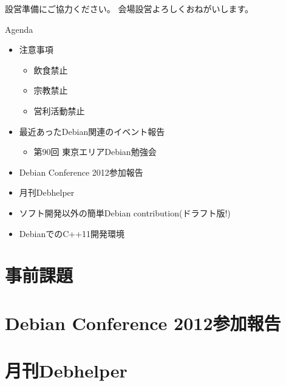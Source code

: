 \frame{\titlepage{}}

\begin{frame}{設営準備にご協力ください。}
会場設営よろしくおねがいします。
\end{frame}

\begin{frame}{Agenda}
\begin{minipage}[t]{0.45\hsize}
  \begin{itemize}
  \item 注意事項
	\begin{itemize}
	 \item 飲食禁止
	 \item 宗教禁止
	 \item 営利活動禁止
	\end{itemize}
   \item 最近あったDebian関連のイベント報告
	\begin{itemize}
        \item 第90回 東京エリアDebian勉強会
	\end{itemize}
 \end{itemize}
\end{minipage} 
\begin{minipage}[t]{0.45\hsize}
 \begin{itemize}
  \item Debian Conference 2012参加報告
  \item 月刊Debhelper
  \item ソフト開発以外の簡単Debian contribution(ドラフト版!)
  \item DebianでのC++11開発環境
 \end{itemize}
\end{minipage}
\end{frame}

\section{事前課題}
{\footnotesize
 
}

\section{Debian Conference 2012参加報告}


\section{月刊Debhelper}

